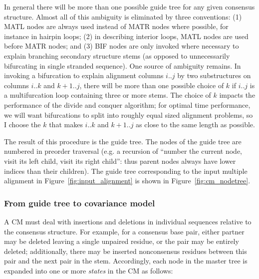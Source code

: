 \documentclass[11pt]{article}
\begin{document}
In general there will be more than one possible guide tree for any
given consensus structure. Almost all of this ambiguity is eliminated
by three conventions: (1) MATL nodes are always used instead of MATR
nodes where possible, for instance in hairpin loops; (2) in describing
interior loops, MATL nodes are used before MATR nodes; and (3) BIF
nodes are only invoked where necessary to explain branching secondary
structure stems (as opposed to unnecessarily bifurcating in single
stranded sequence). One source of ambiguity remains. In invoking a
bifurcation to explain alignment columns $i..j$ by two substructures
on columns $i..k$ and $k+1..j$, there will be more than one possible
choice of $k$ if $i..j$ is a multifurcation loop containing three or
more stems. The choice of $k$ impacts the performance of the divide
and conquer algorithm; for optimal time performance, we will want
bifurcations to split into roughly equal sized alignment problems, so
I choose the $k$ that makes $i..k$ and $k+1..j$ as close to the same
length as possible.

The result of this procedure is the guide tree. The nodes of the guide
tree are numbered in preorder traversal (e.g. a recursion of ``number
the current node, visit its left child, visit its right child'': thus
parent nodes always have lower indices than their children). The guide
tree corresponding to the input multiple alignment in
Figure~\ref{fig:input_alignment} is shown in
Figure~\ref{fig:cm_nodetree}.

\subsubsection{From guide tree to covariance model}

A CM must deal with insertions and deletions in individual sequences
relative to the consensus structure. For example, for a consensus base
pair, either partner may be deleted leaving a single unpaired residue,
or the pair may be entirely deleted; additionally, there may be
inserted nonconsensus residues between this pair and the next pair in
the stem. Accordingly, each node in the master tree is expanded into
one or more \emph{states} in the CM as follows:
\end{document}
